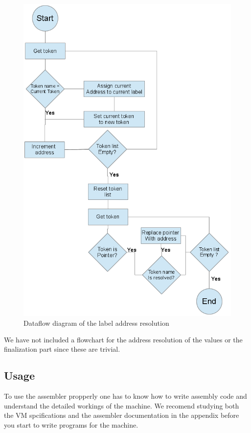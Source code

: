 \documentclass{article}
\begin{document}
\begin{figure}[H]
\begin{centering}
\includegraphics[width=\textwidth,height=\textheight,keepaspectratio]{address.png}
\caption{Dataflow diagram of the label address resolution}
\end{centering}
\end{figure}
\newpage
We have not included a flowchart for the address resolution of the values or
the finalization part since these are trivial.
\subsection{Usage}
To use the assembler propperly one has to know how to write assembly code and
understand the detailed workings of the machine. We recomend studying both the
VM spcifications and the assembler documentation in the appendix before you
start to write programs for the machine.
\end{document}
